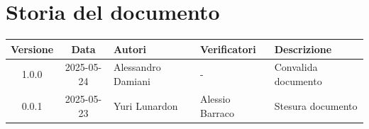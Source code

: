 \section*{Storia del documento}
\begin{tabularx}{\textwidth}{ c c p{3cm} p{3.17cm} X }
    \rowcolor{gray!20}\rule{0pt}{0.5cm}\textbf{Versione} & \textbf{Data} & \textbf{Autori} & \textbf{Verificatori} & \textbf{Descrizione} \\[0.7ex]
    
    \hline
    \rule{0pt}{0.5cm}1.0.0 & 2025-05-24 &  Alessandro Damiani & - & Convalida documento\\[0.7ex]  
    \rule{0pt}{0.5cm}0.0.1 & 2025-05-23 &  Yuri Lunardon & Alessio Barraco & Stesura documento\\[0.7ex] 
\end{tabularx}
